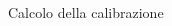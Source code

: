 \documentclass [xcolor=svgnames] {beamer}
\begin{document}
\begin{frame}{Calcolo della calibrazione}
\begin{columns}
\begin{column}{0.45\textwidth}
		\end{column}
		\begin{column}{0.45\textwidth}
			
				\centering
		

\end{column}
\end{columns}
\end{frame}
\end{document}
